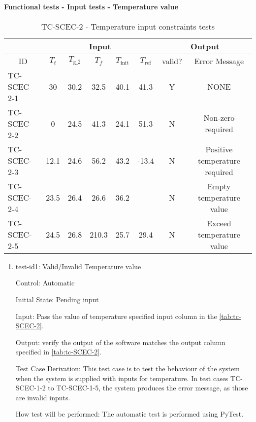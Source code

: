 \documentclass[12pt, titlepage]{article}
\begin{document}
\paragraph{Functional tests - Input tests - Temperature value}


\begin{table}[h!]
\begin{center}
\begin{tabular}{ lccccccc }
\hline
\multicolumn{1}{l|}{}   & \multicolumn{5}{c|}{Input}                            & \multicolumn{2}{c}{Output} \\ 

\hline

\multicolumn{1}{c|}{ID} &   ${T_t}$   &   ${T_\text{g_2}}$  &  $T_f$ & ${T_\text{init}}$ &   \multicolumn{1}{c|}{${T_{\text{ref}}}$}   &   {valid?}   &   Error Message    \\ \hline

TC-SCEC-2-1   &   30  & 30.2 & 32.5   & 40.1  &  41.3    &  Y  & NONE                       \\
TC-SCEC-2-2   &   0  & 24.5  &  41.3  & 24.1  & 51.3     &  N  & Non-zero required           \\
TC-SCEC-2-3   &   12.1 & 24.6 & 56.2  & 43.2  & -13.4    &  N  & Positive temperature required      \\
TC-SCEC-2-4   &  23.5 & 26.4 & 26.6 & 36.2 & & N & Empty temperature value \\ 
TC-SCEC-2-5   &  24.5 & 26.8 & 210.3 & 25.7 & 29.4 & N & Exceed temperature value \\ 


\hline


\end{tabular}
\caption{TC-SCEC-2 - Temperature input constraints tests}
\label{tab:tc-SCEC-2}
\end{center}
\end{table}

\begin{enumerate}   

\item{test-id1: Valid/Invalid Temperature value  \\}

Control: Automatic
					
Initial State: Pending input 
					
Input: Pass the value of temperature specified input column in the \autoref{tab:tc-SCEC-2}.
					
Output: verify the output of the software matches the output column specified in \autoref{tab:tc-SCEC-2}. 

Test Case Derivation: This test case is to test the behaviour of the system when the system is supplied with inputs for temperature. In test cases TC-SCEC-1-2 to TC-SCEC-1-5, the system produces the error message, as those are invalid inputs. 
					
How test will be performed: The automatic test is performed using PyTest.  


					

\end{enumerate}
\end{document}
